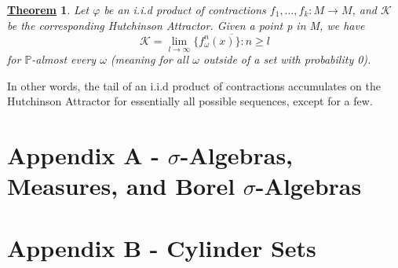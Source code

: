 \documentclass{article}
\newtheorem*{theorem*}{\underline{Theorem}}
\begin{document}
\begin{theorem*}
	Let \(\varphi \) be an i.i.d product of contractions \(f_{1},\dotsc , f_{k}:M\rightarrow M\), and \(\mathcal{K}\) be the corresponding Hutchinson Attractor. Given a point p in M, we have
	\[
		\mathcal{K}=\lim_{l\to \infty}\overline{\{f_{\omega }^{n}(x)\}: n\geq l}
	\]
	for \(\mathbb{P}\)-almost every \(\omega \) (meaning for all \(\omega \) outside of a set with probability 0).
\end{theorem*}
In other words, the tail of an i.i.d product of contractions accumulates on the Hutchinson Attractor for essentially all possible sequences, except for a few.

\section*{Appendix A - \(\sigma \)-Algebras, Measures, and Borel \(\sigma \)-Algebras}

\section*{Appendix B - Cylinder Sets}
\end{document}
